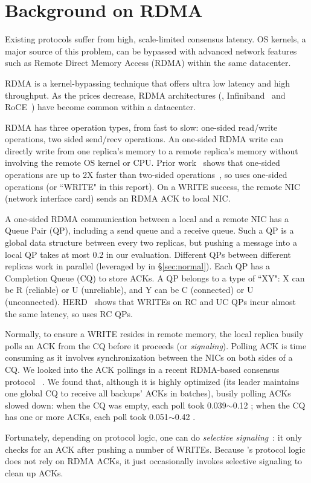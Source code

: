 \section{Background on RDMA}\label{sec:background}

Existing \paxos protocols suffer from high, scale-limited consensus latency. OS 
kernels, a major source of this problem, can be bypassed with advanced network 
features such as Remote Direct Memory Access (RDMA) within the same datacenter.

RDMA is a kernel-bypassing technique that offers ultra low latency and high 
throughput. As the prices decrease, RDMA architectures (\eg, 
Infiniband~\cite{infiniband} and RoCE~\cite{roce}) have become common within a 
datacenter.

RDMA has three operation types, from fast to slow: one-sided 
read/write operations, two sided send/recv operations. An one-sided RDMA write 
can directly write from one replica's memory to a remote replica's memory 
without involving the remote OS kernel or CPU. Prior work~\cite{pilaf:usenix14} 
shows that one-sided operations are up to 2X faster than two-sided 
operations~\cite{fasst:osdi16}, so \xxx uses one-sided operations (or ``WRITE" 
in this report). On a WRITE success, the remote NIC (network interface card) 
sends an RDMA ACK to local NIC.

A one-sided RDMA communication between a local and a remote NIC has
a Queue Pair (QP), including a send queue and a receive 
queue. Such a QP is a global data structure between every two replicas, but 
pushing a message into a local QP takes at most 0.2 \us in our evaluation. 
Different QPs between different replicas work in parallel (leveraged by \xxx in 
\S\ref{sec:normal}). Each QP has a Completion Queue (CQ) to store ACKs. A QP 
belongs to a type of ``XY": X can be R (reliable) or U (unreliable), and Y can 
be C (connected) or U (unconnected). HERD~\cite{herd:sigcomm14} shows that 
WRITEs on RC and UC QPs incur almost the same latency, so \xxx uses RC QPs.

Normally, to ensure a WRITE resides in remote memory, the local replica 
busily polls an ACK from the CQ before it proceeds 
(or \emph{signaling}). Polling ACK is time consuming as it involves 
synchronization between the NICs on both sides of a CQ. We looked into the ACK 
pollings in a recent RDMA-based consensus protocol \dare~\cite{dare:hpdc15}.
We found that, although it is highly optimized (its leader maintains one 
global CQ to receive all backups' ACKs in batches), busily polling ACKs slowed 
\dare down: when the CQ was empty, each poll took 0.039$\sim$0.12 \us; when the 
CQ has one or more ACKs, each poll took 0.051$\sim$0.42 \us.

Fortunately, depending on protocol logic, one can do \emph{selective 
signaling}~\cite{herd:sigcomm14}: it only checks for an ACK after pushing a 
number of WRITEs. Because \xxx's protocol logic does not rely on RDMA ACKs, 
it just occasionally invokes selective signaling to clean up ACKs.